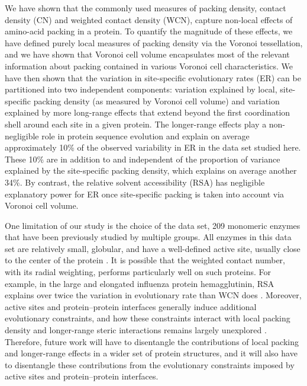 \documentclass[12pt]{article}
\begin{document}
We have shown that the commonly used measures of packing density, contact density (CN) and weighted contact density (WCN), capture non-local effects of amino-acid packing in a protein. To quantify the magnitude of these effects, we have defined purely local measures of packing density via the Voronoi tessellation, and we have shown that Voronoi cell volume encapsulates most of the relevant information about packing contained in various Voronoi cell characteristics. We have then shown that the variation in site-specific evolutionary rates (ER) can be partitioned into two independent components: variation explained by local, site-specific packing density (as measured by Voronoi cell volume) and variation explained by more long-range effects that extend beyond the first coordination shell around each site in a given protein. The longer-range effects play a non-negligible role in protein sequence evolution and explain on average approximately 10\% of the observed variability in ER in the data set studied here. These 10\% are in addition to and independent of the proportion of variance explained by the site-specific packing density, which explains on average another 34\%. By contrast, the relative solvent accessibility (RSA) has negligible explanatory power for ER once site-specific packing is taken into account via Voronoi cell volume.

One limitation of our study is the choice of the data set, 209 monomeric enzymes that have been previously studied by multiple groups. All enzymes in this data set are relatively small, globular, and have a well-defined active site, usually close to the center of the protein \cite{shih_evolutionary_2012}. It is possible that the weighted contact number, with its radial weighting, performs particularly well on such proteins. For example, in the large and elongated influenza protein hemagglutinin, RSA explains over twice the variation in evolutionary rate than WCN does  \cite{meyer_geometric_2015}. Moreover, active sites and protein--protein interfaces generally induce additional evolutionary constraints, and how these constraints interact with local packing density and longer-range steric interactions remains largely unexplored \cite{Deanetal2002, franzosa_structural_2009, meyer_geometric_2015,Abriataetal2015}. Therefore, future work will have to disentangle the contributions of local packing and longer-range effects in a wider set of protein structures, and it will also have to disentangle these contributions from the evolutionary constraints imposed by active sites and protein--protein interfaces.
\end{document}
